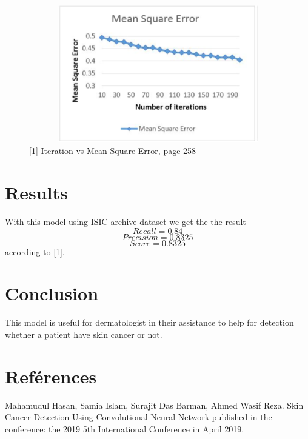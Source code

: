 \documentclass[12pt, letterpaper]{article}
\begin{document}
\begin{figure}[H]
    \includegraphics[width=12cm,height=6cm]{images/discuss_4.png}
    \caption{[1] Iteration vs Mean Square Error, page 258}
    \label{fig:L1}
\end{figure} 

\section{Results}
With this model using ISIC archive dataset we get the the result 
$$Recall = 0.84$$
$$Precision = 0.8325$$
$$Score = 0.8325$$
according to [1].

\newpage
\section{Conclusion}
\par This model is useful for dermatologist in their assistance to help for detection whether a patient have skin cancer or not. 
 


\section{Reférences}
\par [1] Mahamudul Hasan, Samia Islam, Surajit Das Barman, Ahmed Wasif Reza. Skin Cancer Detection Using Convolutional Neural Network published in the conference: the 2019 5th International Conference in April 2019.


\newpage
\printbibliography
\end{document}
